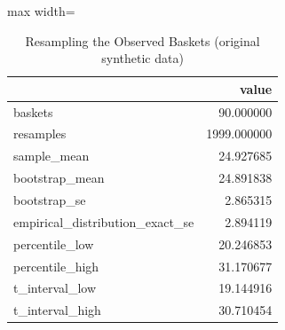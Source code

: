 \begin{table}[htbp]
\centering
\caption{Resampling the Observed Baskets (original synthetic data)}
\begingroup
\small
\setlength{\tabcolsep}{6pt}
\renewcommand{\arraystretch}{1.12}
\begin{adjustbox}{max width=\linewidth}
\begin{tabular}{@{}lr@{}}
\toprule
 & value \\
\midrule
baskets & 90.000000 \\
resamples & 1999.000000 \\
sample\_mean & 24.927685 \\
bootstrap\_mean & 24.891838 \\
bootstrap\_se & 2.865315 \\
empirical\_distribution\_exact\_se & 2.894119 \\
percentile\_low & 20.246853 \\
percentile\_high & 31.170677 \\
t\_interval\_low & 19.144916 \\
t\_interval\_high & 30.710454 \\
\bottomrule
\end{tabular}
\end{adjustbox}
\endgroup
\end{table}